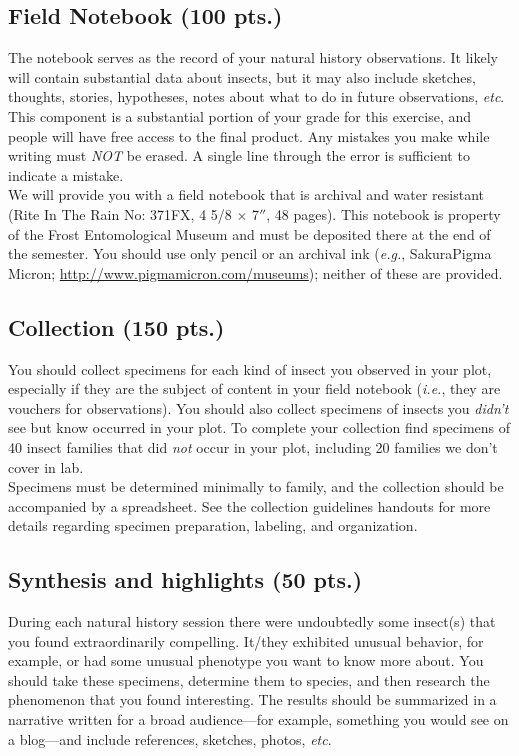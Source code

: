 \documentclass[letterpaper, 11pt]{article}
\begin{document}
\subsection*{Field Notebook (100 pts.)}
The notebook serves as the record of your natural history observations. It likely will contain substantial data about insects, but it may also include sketches, thoughts, stories, hypotheses, notes about what to do in future observations, \textit{etc}. This component is a substantial portion of your grade for this exercise, and people will have free access to the final product. Any mistakes you make while writing must \textit{NOT} be erased. A single line through the error is sufficient to indicate a mistake.\\

\noindent{}We will provide you with a field notebook that is archival and water resistant (Rite In The Rain No: 371FX, 4 5/8 $\times$ 7$''$, 48 pages). This notebook is property of the Frost Entomological Museum and must be deposited there at the end of the semester. You should use only pencil or an archival ink (\textit{e.g.}, Sakura\textregistered{ }Pigma Micron\textregistered; \url{http://www.pigmamicron.com/museums}); neither of these are provided. 

\subsection*{Collection (150 pts.)}
You should collect specimens for each kind of insect you observed in your plot, especially if they are the subject of content in your field notebook (\textit{i.e.}, they are vouchers for observations). You should also collect specimens of insects you \textit{didn't} see but know occurred in your plot. To complete your collection find specimens of 40 insect families that did \textit{not} occur in your plot, including 20 families we don't cover in lab.\\

\noindent{}Specimens must be determined minimally to family, and the collection should be accompanied by a spreadsheet. See the collection guidelines handouts for more details regarding specimen preparation, labeling, and organization.

\subsection*{Synthesis and highlights (50 pts.)}
During each natural history session there were undoubtedly some insect(s) that you found extraordinarily compelling. It/they exhibited unusual behavior, for example, or had some unusual phenotype you want to know more about. You should take these specimens, determine them to species, and then research the phenomenon that you found interesting. The results should be summarized in a narrative written for a broad audience---for example, something you would see on a blog---and include references, sketches, photos, \textit{etc}.
\end{document}
